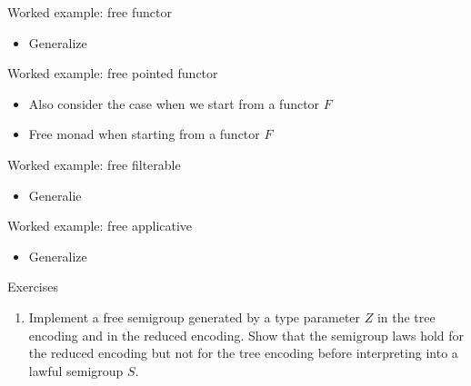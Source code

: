 \documentclass[english,,russian]{beamer}
\begin{document}
\begin{frame}{Worked example: free functor}
\begin{itemize}
\item Generalize 
\end{itemize}
\end{frame}

\begin{frame}{Worked example: free pointed functor}
\begin{itemize}
\item Also consider the case when we start from a functor $F$
\item Free monad when starting from a functor $F$
\end{itemize}
\end{frame}

\begin{frame}{Worked example: free filterable}
\begin{itemize}
\item Generalie
\end{itemize}
\end{frame}

\begin{frame}{Worked example: free applicative}
\begin{itemize}
\item Generalize
\end{itemize}
\end{frame}

\begin{frame}{Exercises}
\begin{enumerate}
\item {\footnotesize{}\vspace{-0.15cm}Implement a free semigroup generated
by a type parameter $Z$ in the tree encoding and in the reduced encoding.
Show that the semigroup laws hold for the reduced encoding but not
for the tree encoding before interpreting into a lawful semigroup
$S$.}{\footnotesize\par}
\end{enumerate}
\end{frame}
\end{document}
